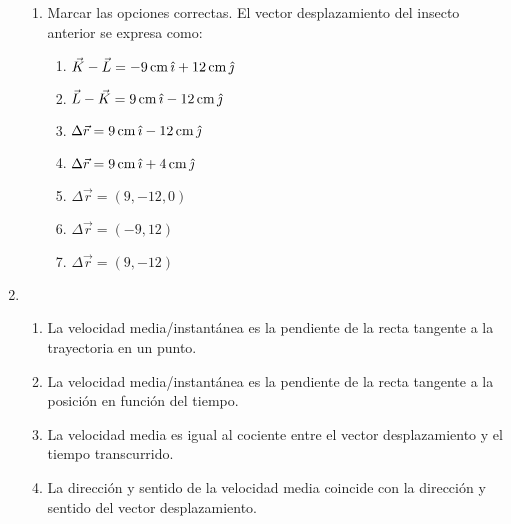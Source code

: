 \documentclass[a4paper,12pt,twoside]{book}
\begin{document}
\begin{mdframed}[style=ejercicio-conceptual]
\begin{enumerate}
\begin{enumerate}
            \item Marcar las opciones correctas. El vector desplazamiento del insecto anterior se expresa como:

            \begin{enumerate}
                \item $\vec{K} - \vec{L} = - 9 \, \si{\centi\metre} \, \hat{\imath} + 12 \, \si{\centi\metre} \, \hat{\jmath}$

                \item $\vec{L} - \vec{K} = 9 \, \si{\centi\metre} \, \hat{\imath} - 12 \, \si{\centi\metre} \, \hat{\jmath}$

                \item $\Delta \vec{r} = 9 \, \si{\centi\metre} \, \hat{\imath} - 12 \, \si{\centi\metre} \, \hat{\jmath}$

                \item $\Delta \vec{r} = 9 \, \si{\centi\metre} \, \hat{\imath} + 4 \, \si{\centi\metre} \, \hat{\jmath}$

                \item $\Delta \vec{r} = (9,-12,0)$

                \item $\Delta \vec{r} = (-9,12)$

                \item $\Delta\vec{r} = (9,-12)$
            \end{enumerate}
        \end{enumerate}
            
        \item {}

        \begin{enumerate}
            \item La velocidad media/instantánea es la pendiente de la recta tangente a la trayectoria en un punto.

            \item La velocidad media/instantánea es la pendiente de la recta tangente a la posición en función del tiempo.

            \item La velocidad media es igual al cociente entre el vector desplazamiento y el tiempo transcurrido.

            \item La dirección y sentido de la velocidad media coincide con la dirección y sentido del vector desplazamiento.


\end{enumerate}
\end{enumerate}
\end{mdframed}
\end{document}
